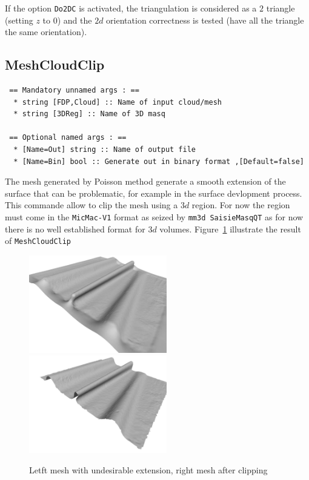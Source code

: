 If the option {\tt Do2DC} is activated, the triangulation is considered
as a $2$ triangle (setting $z$ to $0$) and  the $2d$ orientation correctness is
tested (have all the triangle the same orientation).


\subsection{MeshCloudClip}

\begin{verbatim}
 == Mandatory unnamed args : ==
  * string [FDP,Cloud] :: Name of input cloud/mesh
  * string [3DReg] :: Name of 3D masq

 == Optional named args : ==
  * [Name=Out] string :: Name of output file
  * [Name=Bin] bool :: Generate out in binary format ,[Default=false]
\end{verbatim}


The mesh generated by Poisson method generate a smooth extension of the surface
that can be problematic, for example in the surface devlopment process. This
commande allow to clip the mesh using a $3d$ region.  For now the region
must come in the {\tt MicMac-V1} format as seized by {\tt mm3d SaisieMasqQT}
as for now there is no well established format for $3d$ volumes.
Figure~\ref{fig:MeshClip} illustrate the result of {\tt MeshCloudClip}

\begin{figure}
\centering
\includegraphics[width=6cm]{CommandReferences/ImagesComRef/MeshWithSkirt.jpg}
\includegraphics[width=6cm]{CommandReferences/ImagesComRef/MeshCliped.jpg}
\caption{Letft mesh with undesirable extension, right mesh after clipping}
\label{fig:MeshClip}
\end{figure}



